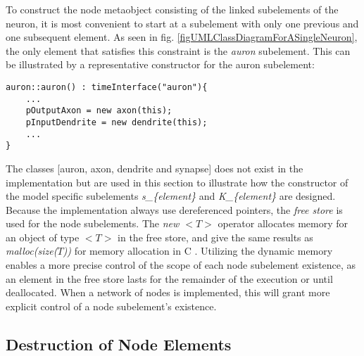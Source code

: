  			To construct the node metaobject consisting of the linked subelements of the neuron, it is most convenient to start at a subelement with only one previous and one subsequent element.
			As seen in fig. \ref{figUMLClassDiagramForASingleNeuron}, the only element that satisfies this constraint is the \emph{auron} subelement.
			This can be illustrated by a representative constructor for the auron subelement:
\begin{lstlisting}
auron::auron() : timeInterface("auron"){
	...
	pOutputAxon = new axon(this);
	pInputDendrite = new dendrite(this);
	...
}
\end{lstlisting}
			The classes [auron, axon, dendrite and synapse] does not exist in the implementation but are used in this section to illustrate how the constructor of the model specific
				subelements \emph{s\_\{element\}} and \emph{K\_\{element\}} are designed.
			Because the implementation always use dereferenced pointers, the \emph{free store} is used for the node subelements.
			The \emph{new $<T>$} operator allocates memory for an object of type $<T>$ in the free store, and give the same results as \emph{malloc(size($T$))} for memory allocation in C \cite{Stroustrup2000KAP19}. %
			Utilizing the dynamic memory enables a more precise control of the scope of each node subelement existence, 
				as an element in the free store lasts for the remainder of the execution or until deallocated\cite[Appendix~C.9]{Stroustrup2000}.
			When a network of nodes is implemented, this will grant more explicit control of a node subelement's existence. %

			



			
		\subsection{Destruction of Node Elements}
		

